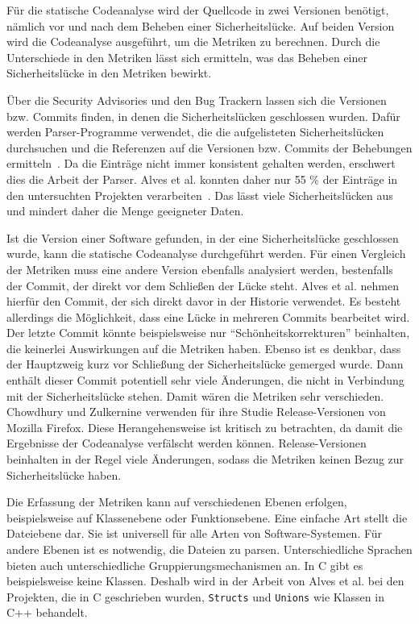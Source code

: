 Für die statische Codeanalyse wird der Quellcode in zwei Versionen benötigt, nämlich vor und nach dem Beheben einer Sicherheitslücke.
Auf beiden Version wird die Codeanalyse ausgeführt, um die Metriken zu berechnen.
Durch die Unterschiede in den Metriken lässt sich ermitteln, was das Beheben einer Sicherheitslücke in den Metriken bewirkt.

Über die Security Advisories und den Bug Trackern lassen sich die Versionen bzw. Commits finden, in denen die Sicherheitslücken geschlossen wurden.
Dafür werden Parser-Programme verwendet, die die aufgelisteten Sicherheitslücken durchsuchen und die Referenzen auf die Versionen bzw. Commits der Behebungen ermitteln~\cite{alves_et_al,chowdhury_zulkernine_2009}.
Da die Einträge nicht immer konsistent gehalten werden, erschwert dies die Arbeit der Parser.
Alves et al. konnten daher nur 55 \% der Einträge in den untersuchten Projekten verarbeiten~\cite{alves_et_al}.
Das lässt viele Sicherheitslücken aus und mindert daher die Menge geeigneter Daten.

Ist die Version einer Software gefunden, in der eine Sicherheitslücke geschlossen wurde, kann die statische Codeanalyse durchgeführt werden.
Für einen Vergleich der Metriken muss eine andere Version ebenfalls analysiert werden, bestenfalls der Commit, der direkt vor dem Schließen der Lücke steht.
Alves et al. nehmen hierfür den Commit, der sich direkt davor in der Historie verwendet.
Es besteht allerdings die Möglichkeit, dass eine Lücke in mehreren Commits bearbeitet wird.
Der letzte Commit könnte beispielsweise nur "`Schönheitskorrekturen"' beinhalten, die keinerlei Auswirkungen auf die Metriken haben.
Ebenso ist es denkbar, dass der Hauptzweig kurz vor Schließung der Sicherheitslücke gemerged wurde.
Dann enthält dieser Commit potentiell sehr viele Änderungen, die nicht in Verbindung mit der Sicherheitslücke stehen.
Damit wären die Metriken sehr verschieden.
Chowdhury und Zulkernine verwenden für ihre Studie Release-Versionen von Mozilla Firefox.
Diese Herangehensweise ist kritisch zu betrachten, da damit die Ergebnisse der Codeanalyse verfälscht werden können.
Release-Versionen beinhalten in der Regel viele Änderungen, sodass die Metriken keinen Bezug zur Sicherheitslücke haben.

Die Erfassung der Metriken kann auf verschiedenen Ebenen erfolgen, beispielsweise auf Klassenebene oder Funktionsebene.
Eine einfache Art stellt die Dateiebene dar.
Sie ist universell für alle Arten von Software-Systemen.
Für andere Ebenen ist es notwendig, die Dateien zu parsen.
Unterschiedliche Sprachen bieten auch unterschiedliche Gruppierungsmechanismen an.
In C gibt es beispielsweise keine Klassen.
Deshalb wird in der Arbeit von Alves et al. bei den Projekten, die in C geschrieben wurden, \texttt{Structs} und \texttt{Unions} wie Klassen in C++ behandelt.

